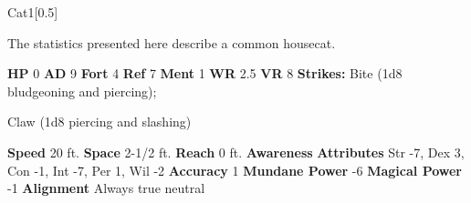   
  \begin{monsection}{Cat}{1}[0.5]
    \vspace{-1em}\vspace{-1em}
    \vspace{0em}

    
      The statistics presented here describe a common housecat.
    
    

    \begin{spellcontent}
      \begin{spelltargetinginfo}
        \pari \textbf{HP} 0 \monsep
          \textbf{AD} 9 \monsep
          \textbf{Fort} 4 \monsep
          \textbf{Ref} 7 \monsep
          \textbf{Ment} 1
        \pari \textbf{WR} 2.5 \monsep
        \textbf{VR} 8
        \pari \textbf{Strikes:}
            Bite  (1d8 bludgeoning and piercing);
\par Claw  (1d8 piercing and slashing)
      \end{spelltargetinginfo}
    \end{spellcontent}
    \begin{monsterfooter}
      \pari \textbf{Speed} 20 ft. \monsep
        \textbf{Space} 2-1/2 ft. \monsep
        \textbf{Reach} 0 ft.
      \pari \textbf{Awareness} 
      \pari \textbf{Attributes}
        Str -7, Dex 3,
        Con -1, Int -7,
        Per 1, Wil -2
      \pari \textbf{Accuracy} 1 \monsep
        \textbf{Mundane Power} -6 \monsep
      \textbf{Magical Power} -1
      \pari \textbf{Alignment} Always true neutral
    \end{monsterfooter}
  \end{monsection}
  
